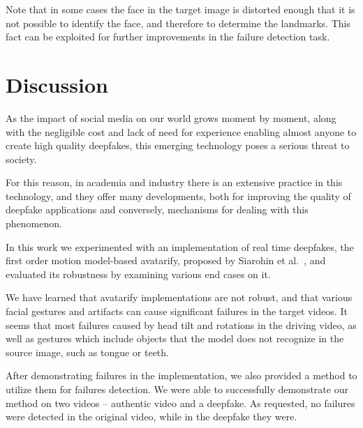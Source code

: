 \documentclass[english,12pt]{article}
\begin{document}
Note that in some cases the face in the target image is distorted enough that it is not possible to identify the face,
and therefore to determine the landmarks. This fact can be exploited for further improvements in the failure detection task.



\section{Discussion} \label{discussion}

As the impact of social media on our world grows moment by moment, along with the negligible cost
and lack of need for experience enabling almost anyone to create high quality deepfakes, this
emerging technology poses a serious threat to society.

For this reason, in academia and industry there is an extensive practice in this technology, and
they offer many developments, both for improving the quality of deepfake applications and conversely,
mechanisms for dealing with this phenomenon.

In this work we experimented with an implementation of real time deepfakes, the first order motion
model-based avatarify, proposed by Siarohin et al.~\cite{DBLP:journals/corr/abs-2003-00196}, and
evaluated its robustness by examining various end cases on it.

We have learned that avatarify implementations are not robust, and that various facial gestures
and artifacts can cause significant failures in the target videos. It seems that most failures
caused by head tilt and rotations in the driving video, as well as gestures which include objects
that the model does not recognize in the source image, such as tongue or teeth.

After demonstrating failures in the implementation, we also provided a method to utilize them for
failures detection. We were able to successfully demonstrate our method on two videos -- authentic
video and a deepfake. As requested, no failures were detected in the original video, while in the
deepfake they were.


\pagebreak{}
\pagebreak{}



\end{document}

